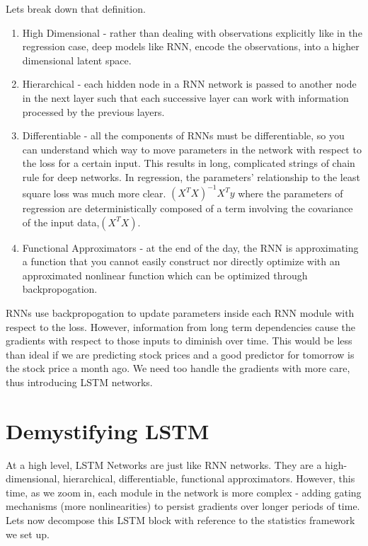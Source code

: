 \documentclass{article}
\begin{document}
\noindent Lets break down that definition.
\begin{enumerate}
  \item High Dimensional - rather than dealing with observations explicitly like in the regression case, deep models like RNN, encode the observations, into a higher dimensional latent space.
  \item Hierarchical - each hidden node in a RNN network is passed to another node in the next layer such that each successive layer can work with information processed by the previous layers.
  \item Differentiable - all the components of RNNs must be differentiable, so you can understand which way to move parameters in the network with respect to the loss for a certain input. This results in long, complicated strings of chain rule for deep networks. In regression, the parameters' relationship to the least square loss was much more clear. $(X^TX)^{-1}X^Ty$ where the parameters of regression are deterministically composed of a term involving the covariance of the input data,$(X^TX)$.
  \item Functional Approximators - at the end of the day, the RNN is approximating a function that you cannot easily construct nor directly optimize with an approximated nonlinear function which can be optimized through backpropogation.
\end{enumerate}

\noindent RNNs use backpropogation to update parameters inside each RNN module with respect to the loss. However, information from long term dependencies cause the gradients with respect to those inputs to diminish over time. This would be less than ideal if we are predicting stock prices and a good predictor for tomorrow is the stock price a month ago. We need too handle the gradients with more care, thus introducing LSTM networks.

\section{Demystifying LSTM}

At a high level, LSTM Networks are just like RNN networks. They are a high-dimensional, hierarchical, differentiable, functional approximators. However, this time, as we zoom in, each module in the network is more complex - adding gating mechanisms (more nonlinearities) to persist gradients over longer periods of time. Lets now decompose this LSTM block with reference to the statistics framework we set up.\\
\end{document}
